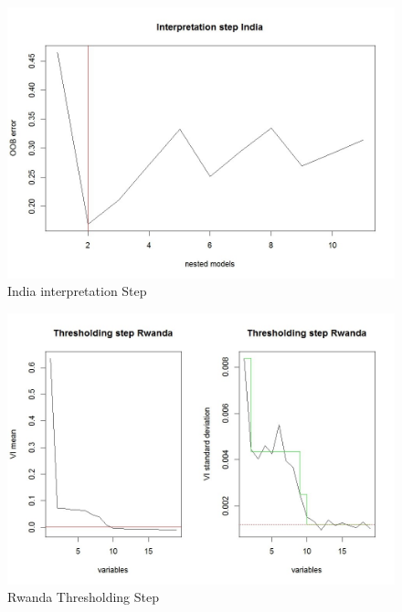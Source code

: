 \documentclass[11pt]{article}
\begin{document}
\FloatBarrier
\begin{figure}[!htb]
\begin{center}
\includegraphics[scale=0.55]{F2.jpg}
\caption{India interpretation Step }
\label{figure13}
\end{center}
\end{figure}
\FloatBarrier

\FloatBarrier
\begin{figure}[!htb]
\begin{center}
\includegraphics[scale=0.55]{F3.jpg}
\caption{Rwanda Thresholding Step}
\label{figure14}
\end{center}
\end{figure}
\FloatBarrier
\end{document}
